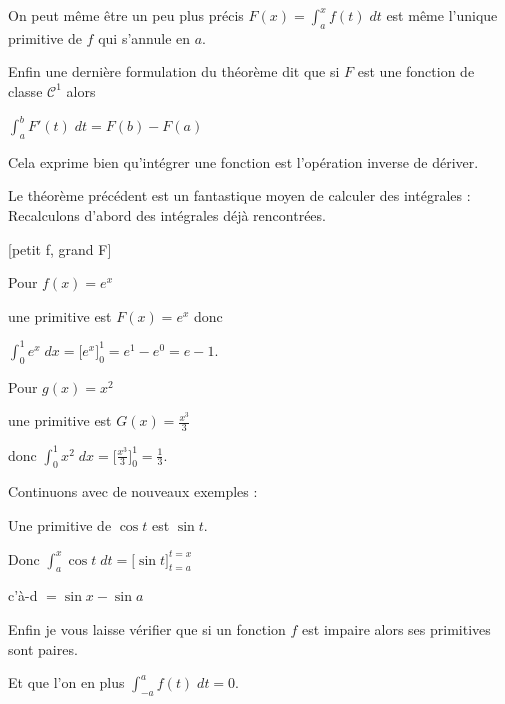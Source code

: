 On peut même être un peu plus précis 
$F(x)=\int_a^x f(t) \; dt$ est même l'unique primitive de $f$ qui s'annule en $a$.


\change

Enfin une dernière formulation du théorème dit que si $F$ est une fonction de classe $\mathcal{C}^1$ alors

$\int_a^b F'(t) \; dt = F(b)-F(a)$


Cela exprime bien qu'intégrer une fonction est l'opération inverse de dériver.


\diapo



Le théorème précédent est un fantastique moyen de calculer des intégrales :
 Recalculons d'abord des intégrales déjà rencontrées.

[petit f, grand F]

\change

 Pour $f(x)=e^x$ 

\change

une primitive est $F(x)=e^x$ donc

\change

$\int_0^1 e^x \; dx =  \big[e^x\big]_0^1=e^1-e^0=e-1.$

\change

Pour $g(x)=x^2$ 

\change

une primitive est $G(x)=\frac{x^3}{3}$ 


\change

donc $\int_0^1 x^2 \; dx =  \big[\tfrac{x^3}{3}\big]_0^1=\tfrac{1}{3}.$

\change 

Continuons avec de nouveaux exemples :

\change

Une primitive de $\cos t$ est $\sin t$.

Donc 
$\int_a^x \cos t \; dt = \big[ \sin t\big]_{t=a}^{t=x}$


c'à-d $= \sin x - \sin a$


\change

Enfin je vous laisse vérifier que si un fonction $f$ est impaire alors 
ses primitives sont paires.

\change

Et que l'on en plus $\int_{-a}^a f(t)  \; dt = 0$.


